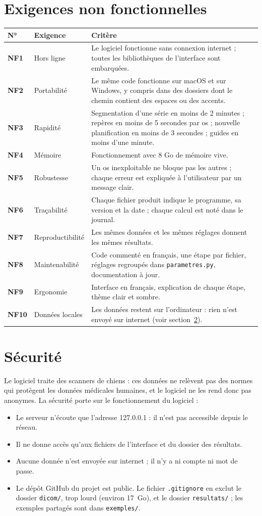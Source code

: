 \documentclass[11pt,a4paper]{article}
\newcommand{\fichier}[1]{\texttt{\small #1}}
\newcommand{\ligne}[3]{\textbf{#1} & #2 & #3 \\ \midrule}
\newcommand{\reserver}[1]{\par\vskip 0pt plus #1\penalty-200\vskip 0pt plus -#1\relax}
\begin{document}
\reserver{9\baselineskip}
\section{Exigences non fonctionnelles}

\begin{longtable}{@{}p{1.2cm}p{4.2cm}p{9.8cm}@{}}
\toprule
\textbf{N°} & \textbf{Exigence} & \textbf{Critère} \\ \midrule \endhead
\ligne{NF1}{Hors ligne}{Le logiciel fonctionne sans connexion internet ; toutes les bibliothèques de l'interface sont
  embarquées.}
\ligne{NF2}{Portabilité}{Le même code fonctionne sur macOS et sur Windows, y compris dans des dossiers dont le chemin
  contient des espaces ou des accents.}
\ligne{NF3}{Rapidité}{Segmentation d'une série en moins de 2 minutes ; repères en moins de 5 secondes par os ;
  nouvelle planification en moins de 3 secondes ; guides en moins d'une minute.}
\ligne{NF4}{Mémoire}{Fonctionnement avec 8 Go de mémoire vive.}
\ligne{NF5}{Robustesse}{Un os inexploitable ne bloque pas les autres ; chaque erreur est expliquée à l'utilisateur
  par un message clair.}
\ligne{NF6}{Traçabilité}{Chaque fichier produit indique le programme, sa version et la date ; chaque calcul est noté
  dans le journal.}
\ligne{NF7}{Reproductibilité}{Les mêmes données et les mêmes réglages donnent les mêmes résultats.}
\ligne{NF8}{Maintenabilité}{Code commenté en français, une étape par fichier, réglages regroupés dans
  \fichier{parametres.py}, documentation à jour.}
\ligne{NF9}{Ergonomie}{Interface en français, explication de chaque étape, thème clair et sombre.}
\ligne{NF10}{Données locales}{Les données restent sur l'ordinateur : rien n'est envoyé sur internet (voir
  section~\ref{sec:securite}).}
\bottomrule
\end{longtable}

\section{Sécurité}
\label{sec:securite}

Le logiciel traite des scanners de chiens : ces données ne relèvent pas des normes qui protègent les données médicales
humaines, et le logiciel ne les rend donc pas anonymes. La sécurité porte sur le fonctionnement du logiciel :
\begin{itemize}
  \item Le serveur n'écoute que l'adresse 127.0.0.1 : il n'est pas accessible depuis le réseau.
  \item Il ne donne accès qu'aux fichiers de l'interface et du dossier des résultats.
  \item Aucune donnée n'est envoyée sur internet ; il n'y a ni compte ni mot de passe.
  \item Le dépôt GitHub du projet est public. Le fichier \fichier{.gitignore} en exclut le dossier \fichier{dicom/},
        trop lourd (environ 17~Go), et le dossier \fichier{resultats/} ; les exemples partagés sont dans
        \fichier{exemples/}.
\end{itemize}
\end{document}

